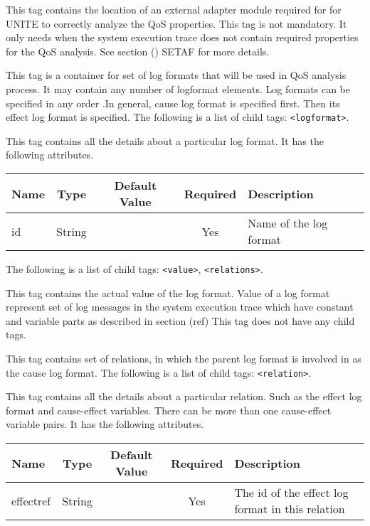 
This tag contains the location of an external adapter module required for 
for UNITE to correctly analyze the QoS properties. This tag is not 
mandatory. It only needs when the system execution trace does not 
contain required properties for the QoS analysis. See section () SETAF 
for more details.


This tag is a container for set of log formats that will be used in QoS 
analysis process. It may contain any number of logformat elements. 
Log formats can be specified in any order .In general, cause log format 
is specified first. Then its effect log format is specified. 
The following is a list of child tags: \texttt{<logformat>}.


This tag contains all the details about a particular log format. It has the following 
attributes.
\begin{table}[h]
  \begin{tabular}{lcccl}
  \hline
  \textbf{Name} & \textbf{Type} & \textbf{Default Value} & \textbf{Required} & \textbf{Description} \\
  \hline
  id & String  & & Yes & Name of the log format \\
  \end{tabular}
\end{table}

\noindent The following is a list of child tags:
\texttt{<value>}, \texttt{<relations>}.

This tag contains the actual value of the log format. Value of a log 
format represent set of log messages in the system execution trace 
which have constant and variable parts as described in section (ref) 
This tag does not have any child tags.


This tag contains set of relations, in which the parent log format is 
involved in as the cause log format.
The following is a list of child tags: \texttt{<relation>}.


This tag contains all the details about a particular relation. Such 
as the effect log format and cause-effect variables. There can be 
more than one cause-effect variable pairs. It has the following 
attributes.
\begin{table}[h]
  \begin{tabular}{lcccl}
  \hline
  \textbf{Name} & \textbf{Type} & \textbf{Default Value} & \textbf{Required} & \textbf{Description} \\
  \hline
  effectref & String  & & Yes & The id of the effect log format in this relation \\
  \end{tabular}
\end{table}

